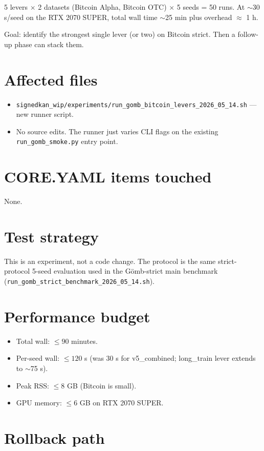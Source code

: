 \documentclass[11pt,a4paper]{article}
\newcommand{\Gomb}{G\"omb}
\begin{document}
5 levers $\times$ 2 datasets (Bitcoin Alpha, Bitcoin OTC)
$\times$ 5 seeds = 50 runs. At $\sim$30 s/seed on the RTX 2070
SUPER, total wall time $\sim$25 min plus overhead $\approx$ 1 h.

Goal: identify the strongest single lever (or two) on Bitcoin
strict. Then a follow-up phase can stack them.

\section{Affected files}

\begin{itemize}
\item \texttt{signedkan\_wip/experiments/run\_gomb\_bitcoin\_levers\_2026\_05\_14.sh}
  --- new runner script.
\item No source edits. The runner just varies CLI flags on the
  existing \texttt{run\_gomb\_smoke.py} entry point.
\end{itemize}

\section{CORE.YAML items touched}

None.

\section{Test strategy}

This is an experiment, not a code change. The protocol is the
same strict-protocol 5-seed evaluation used in the
\Gomb-strict main benchmark
(\texttt{run\_gomb\_strict\_benchmark\_2026\_05\_14.sh}).

\section{Performance budget}

\begin{itemize}
\item Total wall: $\leq 90$ minutes.
\item Per-seed wall: $\leq 120$ s (was 30 s for v5\_combined; long\_train lever extends to $\sim$75 s).
\item Peak RSS: $\leq 8$ GB (Bitcoin is small).
\item GPU memory: $\leq 6$ GB on RTX 2070 SUPER.
\end{itemize}

\section{Rollback path}
\end{document}
